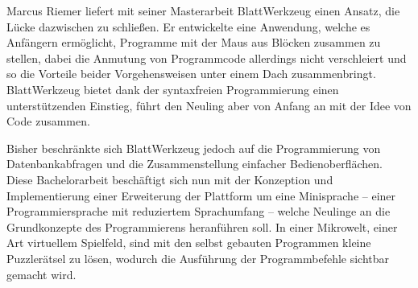 
Marcus Riemer liefert mit seiner Masterarbeit BlattWerkzeug einen Ansatz, die Lücke dazwischen zu schließen. Er entwickelte eine Anwendung, welche es Anfängern ermöglicht, Programme mit der Maus aus Blöcken zusammen zu stellen, dabei die Anmutung von Programmcode allerdings nicht verschleiert und so die Vorteile beider Vorgehensweisen unter einem Dach zusammenbringt. BlattWerkzeug bietet dank der syntaxfreien Programmierung einen unterstützenden Einstieg, führt den Neuling aber von Anfang an mit der Idee von Code zusammen.

Bisher beschränkte sich BlattWerkzeug jedoch auf die Programmierung von Datenbankabfragen und die Zusammenstellung einfacher Bedienoberflächen. Diese Bachelorarbeit beschäftigt sich nun mit der Konzeption und Implementierung einer Erweiterung der Plattform um eine Minisprache -- einer Programmiersprache mit reduziertem Sprachumfang -- welche Neulinge an die Grundkonzepte des Programmierens heranführen soll. In einer Mikrowelt, einer Art virtuellem Spielfeld, sind mit den selbst gebauten Programmen kleine Puzzlerätsel zu lösen, wodurch die Ausführung der Programmbefehle sichtbar gemacht wird.





